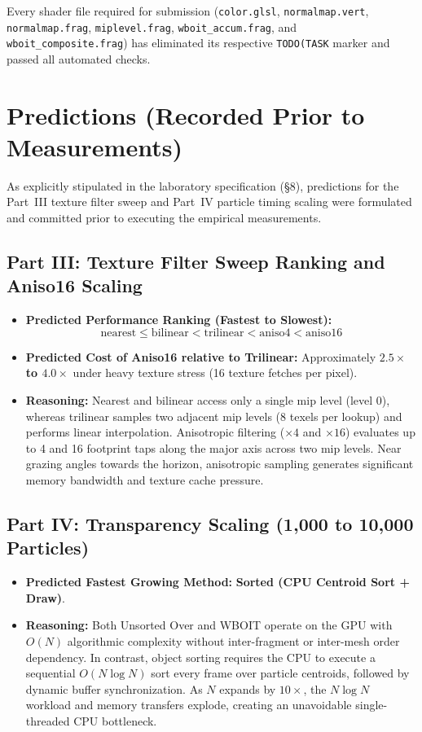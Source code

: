 \documentclass[10pt,a4paper]{article}
\begin{document}
\noindent Every shader file required for submission (\texttt{color.glsl}, \texttt{normalmap.vert}, \texttt{normalmap.frag}, \texttt{miplevel.frag}, \texttt{wboit\_accum.frag}, and \texttt{wboit\_composite.frag}) has eliminated its respective \texttt{TODO(TASK} marker and passed all automated checks.

\section{Predictions (Recorded Prior to Measurements)}

As explicitly stipulated in the laboratory specification (\S8), predictions for the Part~III texture filter sweep and Part~IV particle timing scaling were formulated and committed prior to executing the empirical measurements.

\subsection{Part III: Texture Filter Sweep Ranking and Aniso16 Scaling}
\begin{itemize}
    \item \textbf{Predicted Performance Ranking (Fastest to Slowest):}
    \[
    \text{nearest} \le \text{bilinear} < \text{trilinear} < \text{aniso4} < \text{aniso16}
    \]
    \item \textbf{Predicted Cost of Aniso16 relative to Trilinear:} Approximately \textbf{$2.5\times$ to $4.0\times$} under heavy texture stress (16 texture fetches per pixel).
    \item \textbf{Reasoning:} Nearest and bilinear access only a single mip level (level 0), whereas trilinear samples two adjacent mip levels (8 texels per lookup) and performs linear interpolation. Anisotropic filtering ($\times4$ and $\times16$) evaluates up to 4 and 16 footprint taps along the major axis across two mip levels. Near grazing angles towards the horizon, anisotropic sampling generates significant memory bandwidth and texture cache pressure.
\end{itemize}

\subsection{Part IV: Transparency Scaling (1,000 to 10,000 Particles)}
\begin{itemize}
    \item \textbf{Predicted Fastest Growing Method:} \textbf{Sorted (CPU Centroid Sort + Draw)}.
    \item \textbf{Reasoning:} Both Unsorted Over and WBOIT operate on the GPU with $O(N)$ algorithmic complexity without inter-fragment or inter-mesh order dependency. In contrast, object sorting requires the CPU to execute a sequential $O(N \log N)$ sort every frame over particle centroids, followed by dynamic buffer synchronization. As $N$ expands by $10\times$, the $N \log N$ workload and memory transfers explode, creating an unavoidable single-threaded CPU bottleneck.
\end{itemize}
\end{document}
